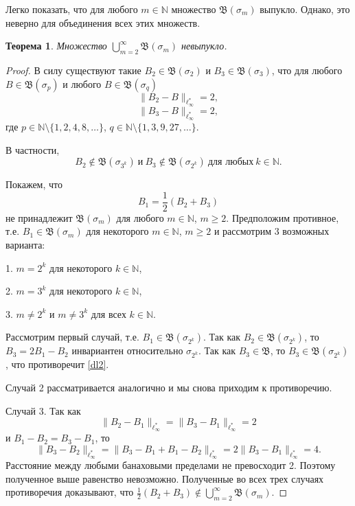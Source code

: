 \documentclass[12pt]{article}
\newtheorem{thm}{Теорема}
\def\N{{\mathbb{N}}}
\begin{document}
Легко показать, что для любого $m\in \N$ множество $\mathfrak B(\sigma_m)$ выпукло. Однако, это неверно для объединения всех этих множеств.

 \begin{thm}
  Множество $\bigcup_{m=2}^\infty\mathfrak B(\sigma_m)$ невыпукло.
 \end{thm}

\begin{proof}
В силу \cite[Теорема 10]{ASSU2} существуют такие $B_2\in \mathfrak B(\sigma_2)$ и $B_3\in \mathfrak B(\sigma_3)$, что для любого $B\in \mathfrak B(\sigma_p)$ и любого $B\in \mathfrak B(\sigma_q)$
\begin{equation}\label{dl1}
\|B_2-B\|_{\ell_\infty^*}=2,
\end{equation}
\begin{equation}\label{dl11}
\|B_3-B\|_{\ell_\infty^*}=2,
\end{equation}
где $p\in \N \setminus \{1,2,4,8,\dots\}$, $q\in \N \setminus \{1,3,9,27,\dots\}$.

В частности,
\begin{equation}\label{dl2}
B_2 \notin \mathfrak B(\sigma_{3^k}) \ \text{и} \ B_3 \notin \mathfrak B(\sigma_{2^k}) \ \text{для любых} \ k\in \N.
\end{equation}

Покажем, что
$$B_1 = \frac12(B_2+B_3)$$
не принадлежит $\mathfrak B(\sigma_m)$ для любого $m\in \N$, $m\ge 2$. Предположим противное, т.е. $B_1 \in\mathfrak B(\sigma_m)$ для некоторого $m\in \N$, $m\ge2$ и рассмотрим 3 возможных варианта:

1. $m=2^k$ для некоторого $k\in \N$,

2. $m=3^k$ для некоторого $k\in \N$,

3. $m\neq 2^k$ и $m\neq 3^k$ для всех $k\in \N$.

Рассмотрим первый случай, т.е. $B_1 \in\mathfrak B(\sigma_{2^k})$. Так как $B_2 \in\mathfrak B(\sigma_{2^k})$, то  $B_3=2B_1-B_2$ инвариантен относительно $\sigma_{2^k}$. Так как $B_3 \in\mathfrak B$, то $B_3 \in\mathfrak B(\sigma_{2^k})$, что противоречит \eqref{dl2}.

Случай 2 рассматривается аналогично и мы снова приходим к противоречию.

Случай 3. Так как
$$\|B_2-B_1\|_{\ell_\infty^*}=\|B_3-B_1\|_{\ell_\infty^*}=2$$
и $B_1-B_2=B_3-B_1$, то
$$\|B_3-B_2\|_{\ell_\infty^*}=\|B_3-B_1+B_1-B_2\|_{\ell_\infty^*}=2\|B_3-B_1\|_{\ell_\infty^*}=4.$$
Расстояние между любыми банаховыми пределами не превосходит 2. Поэтому полученное выше равенство невозможно. Полученные во всех трех случаях противоречия доказывают, что $\frac12(B_2+B_3)\notin \bigcup_{m=2}^\infty\mathfrak B(\sigma_m)$.
\end{proof}
\end{document}
